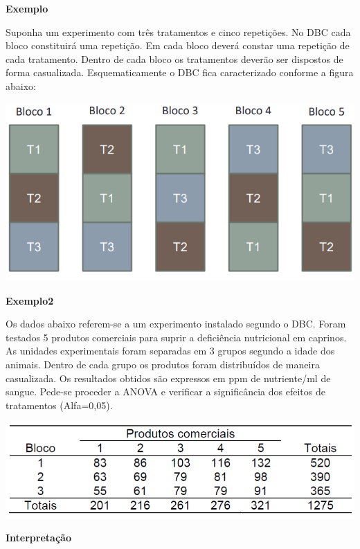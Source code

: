 \documentclass[
]{book}
\begin{document}
\textbf{Exemplo}

Suponha um experimento com três tratamentos e cinco repetições. No DBC cada bloco constituirá uma repetição. Em cada bloco deverá constar uma repetição de cada tratamento. Dentro de cada bloco os tratamentos deverão ser dispostos de forma casualizada. Esquematicamente o DBC fica caracterizado conforme a
figura abaixo:

\includegraphics[width=1\linewidth]{imagens/dbc1}

\textbf{Exemplo2}

Os dados abaixo referem-se a um experimento instalado segundo o DBC. Foram testados 5 produtos comerciais para suprir a deficiência nutricional em caprinos. As unidades experimentais foram separadas em 3 grupos segundo a idade dos animais. Dentro de cada grupo os produtos foram distribuídos de maneira casualizada. Os resultados obtidos são expressos em ppm de nutriente/ml de sangue. Pede-se proceder a ANOVA e verificar a significância dos efeitos de tratamentos (Alfa=0,05).

\includegraphics[width=1\linewidth]{imagens/dbc_ex}

\textbf{Interpretação}
\end{document}
